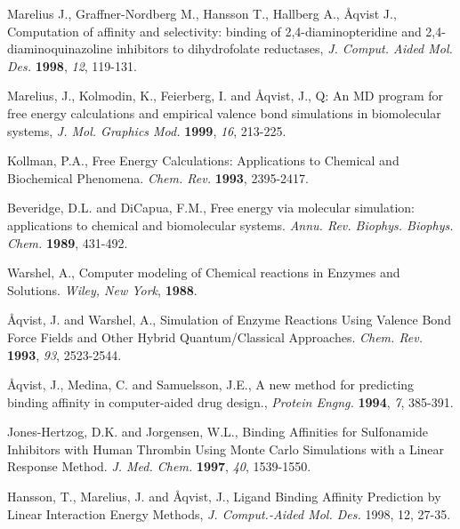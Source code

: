 \documentclass[a4paper,10pt]{article}
\begin{document}
\begin{thebibliography}{2}

  
Marelius J., Graffner-Nordberg M., Hansson T., Hallberg A., \AA qvist J.,
Computation of affinity and selectivity: binding of 2,4-diaminopteridine and
2,4-diaminoquinazoline inhibitors to dihydrofolate reductases,
\textit{J. Comput. Aided Mol. Des.} \textbf{1998}, \textit{12}, 119-131.
  
Marelius, J.,  Kolmodin, K., Feierberg,  I. and
\AA qvist,  J.,
Q: An  MD  program  for  free energy  calculations  and
empirical   valence  bond   simulations  in   biomolecular  systems,
\textit{J. Mol. Graphics Mod.} \textbf{1999}, \textit{16}, 213-225.

Kollman, P.A.,
Free Energy Calculations: Applications to Chemical and Biochemical
Phenomena.
\textit{Chem. Rev.} \textbf{1993}, 2395-2417.

Beveridge, D.L. and DiCapua, F.M.,
Free energy via molecular simulation: applications to chemical and
biomolecular systems.
\textit{Annu. Rev. Biophys. Biophys. Chem.} \textbf{1989}, 431-492.

Warshel, A.,
Computer modeling of Chemical reactions in Enzymes and Solutions.
\textit{Wiley, New York}, \textbf{1988}.

\AA qvist, J. and Warshel, A.,
Simulation of Enzyme Reactions Using Valence Bond Force Fields
and Other Hybrid Quantum/Classical Approaches.
\textit{Chem. Rev.} \textbf{1993}, \textit{93}, 2523-2544.

\AA qvist, J., Medina, C. and Samuelsson, J.E.,
A new method for predicting binding affinity in computer-aided drug
design.,
\textit{Protein Engng.} \textbf{1994}, \textit{7}, 385-391.

Jones-Hertzog, D.K. and Jorgensen, W.L.,
Binding Affinities for Sulfonamide Inhibitors with Human Thrombin
Using Monte Carlo Simulations with a Linear Response Method.
\textit{J. Med. Chem.} \textbf{1997}, \textit{40}, 1539-1550.

Hansson, T., Marelius, J. and {\AA}qvist, J., Ligand Binding Affinity
Prediction by Linear Interaction Energy Methods,
\textit{J. Comput.-Aided Mol. Des.} 1998, 12, 27-35.


\end{thebibliography}
\end{document}
